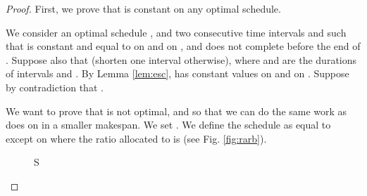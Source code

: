 \documentclass{llncs}
\newcommand{\s}{\mathcal S\xspace}
\begin{document}
\begin{proof}
First, we prove that  is constant on any optimal
schedule.

We consider an optimal schedule , and two consecutive time intervals  and
 such that  is constant and equal to  on  and  on , and
 does not complete before the end of . Suppose also that  (shorten one interval otherwise), where  and
 are the durations of intervals  and . By Lemma \ref{lem:esc}, 
 has constant values  on  and  on
. Suppose by contradiction that .

We want to prove that  is not optimal, and so that we can do the
same work as  does on  in a smaller makespan. We
set .  We define
the schedule  as equal to  except on  where the ratio
allocated to  is  (see Fig. \ref{fig:rarb}).
\begin{figure}[tb]
\centering
\ifdefined\s
\else
\newcommand{\s}{S}
\fi

\newcommand{\ya}{30pt}
\newcommand{\yb}{50pt}

\newcommand{\yf}{.5*\ya+.5*\yb}

\newcommand{\topy}{70pt}
\newcommand{\topx}{100pt}
\newcommand{\midx}{60pt}

\newcommand{\midlx}{50pt}

\newcommand{\scalerat}{0.8}
\end{figure}
\end{proof}
\end{document}
